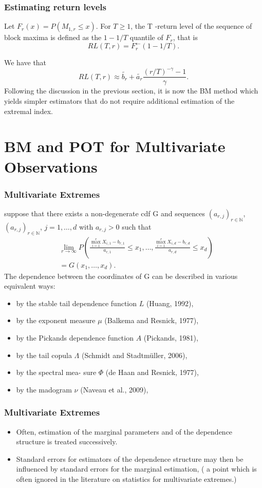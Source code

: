 \documentclass{beamer}
\newcommand{\suit}[1]{\left(#1\right)}
\begin{document}
\begin{frame}
    \frametitle{Estimating return levels}
Let $F_r(x)=P(M_{1,r}\le x)$. For $T\ge 1$, the T -return level of the sequence of block maxima is defined as the $1-1/T$ quantile of $F_r$, that is
$$
RL(T,r)=F_r^{\leftarrow}(1-1/T).
$$
    
We have that 
$$
RL(T,r) \approx \tilde{b_r}+\tilde{a_r}\frac{(r/T)^{-\gamma}-1}{\gamma}.
$$
Following the
discussion in the previous section, it is now the BM method which yields simpler estimators that
do not require additional estimation of the extremal index.
\end{frame}

\section{BM and POT for Multivariate Observations}

\begin{frame}
    \frametitle{Multivariate Extremes}
    suppose that there exists a non-degenerate cdf G and sequences $(a_{r,j})_{r\in \mathbb{N}}$, $(a_{r,j})_{r\in \mathbb{N}}$, $j=1,\dots,d$ with $a_{r,j}>0$ such that
    $$
    \begin{aligned}
&\lim_{r\to \infty}P\suit{\frac{\max_{i=1}^r X_{i,1}-b_{r,1}}{a_{r,1}}\le x_1,\dots,\frac{\max_{i=1}^r X_{i,d}-b_{r,d}}{a_{r,d}}\le x_d}\\
&=G(x_1,\dots,x_d).
    \end{aligned}
    $$
    The dependence between the coordinates of G can be described in various equivalent ways:
\begin{itemize}
    \item by the stable tail dependence function $L$ (Huang, 1992), 
    \item by
    the exponent measure $\mu$ (Balkema and Resnick, 1977), 
    \item by the Pickands dependence function $A$
    (Pickands, 1981), 
    \item by the tail copula $\Lambda$ (Schmidt and Stadtmüller, 2006),
    \item  by the spectral mea-
    sure $\Phi$ (de Haan and Resnick, 1977),
    \item by the madogram $\nu$ (Naveau et al., 2009),
\end{itemize}
    

\end{frame}



\begin{frame}
    \frametitle{Multivariate Extremes}
\begin{itemize}
    \item  Often, estimation of the marginal parameters and of the dependence structure is
    treated successively.
    \item  Standard errors for estimators of the dependence
    structure may then be influenced by standard errors for the marginal estimation, ( a point which
    is often ignored in the literature on statistics for multivariate extremes.)
\end{itemize}


\end{frame}
\end{document}
